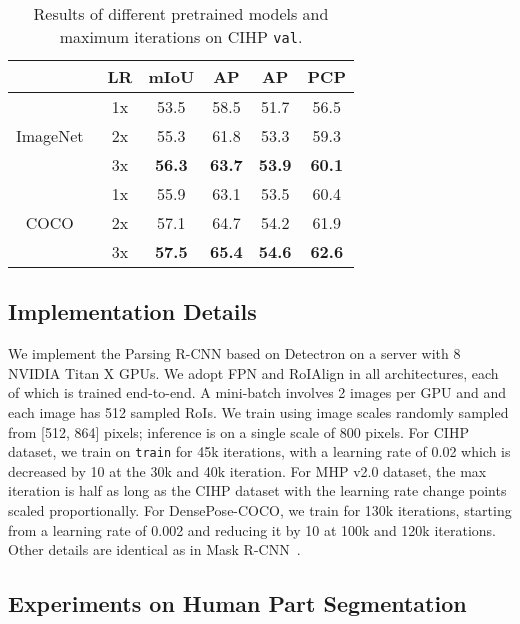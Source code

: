 \documentclass[10pt,twocolumn,letterpaper]{article}
\begin{document}
\begin{table}[t]
\centering
\small
\begin{tabular}{c|c|cccc}
& LR & mIoU  &  AP & AP  & PCP \\
 \toprule[0.2em]
\multirow{3}{*}{ImageNet~\cite{Russakovsky_ijcv2015_imagenet}} & 1x & 53.5 & 58.5 & 51.7 & 56.5 \\
                                          & 2x & 55.3 & 61.8 & 53.3 & 59.3 \\
                                          & 3x & \textbf{56.3} & \textbf{63.7} & \textbf{53.9} & \textbf{60.1} \\
\hline
\multirow{3}{*}{COCO~\cite{Lin_eccv2014_coco}}  & 1x & 55.9 & 63.1 & 53.5 & 60.4 \\
                                      & 2x & 57.1 & 64.7 & 54.2 & 61.9 \\
                                      & 3x & \textbf{57.5} & \textbf{65.4} & \textbf{54.6} & \textbf{62.6} \\
\end{tabular}
\vspace{.5em}
  \caption{Results of different pretrained models and maximum iterations on CIHP \texttt{val}.}
  \label{tab:coco_pretrain}
\vspace{-.8em}
\end{table}


\subsection{Implementation Details} 
We implement the Parsing R-CNN based on Detectron on a server with 8 NVIDIA Titan X GPUs. We adopt FPN and RoIAlign in all architectures, each of which is trained end-to-end. A mini-batch involves 2 images per GPU and and each image has 512 sampled RoIs.  We train using image scales randomly sampled from [512, 864] pixels; inference is on a single scale of 800 pixels. For CIHP dataset,  we train on \texttt{train} for 45k iterations, with a learning rate of 0.02 which is decreased by 10 at the 30k and 40k iteration. For MHP v2.0 dataset,  the max iteration is half as long as the CIHP dataset with the learning rate change points scaled proportionally. For DensePose-COCO,  we train for 130k iterations, starting from a learning rate of 0.002 and reducing it by 10 at 100k and 120k iterations. Other details are identical as in Mask R-CNN~\cite{He_iccv2017_maskrcnn, Goyal_arxiv2017_1hour}.

\subsection{Experiments on Human Part Segmentation} 
\end{document}
